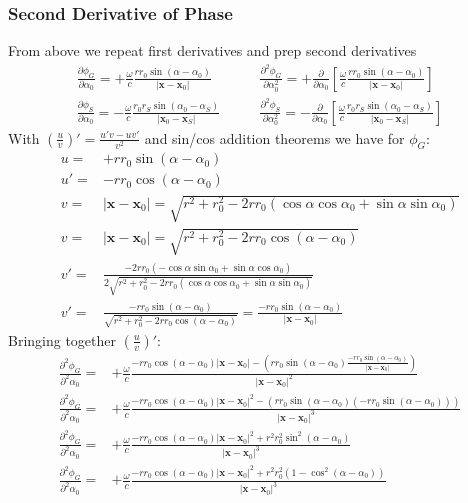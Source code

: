 \documentclass[a4paper,BCOR=15mm,10pt,twoside]{scrartcl}
\newcommand\wc{\frac{\omega}{c}}  %
\newcommand\azx{\alpha}  %
\renewcommand{\vec}[1]{\mathbf{#1}}  %
\begin{document}
\subsubsection{Second Derivative of Phase}
From above we repeat first derivatives and prep second derivatives
\begin{align}
\frac{\partial \phi_G}{\partial \azx_0} =+\wc \frac{r r_0 \sin(\azx-\azx_0)}{|\vec{x} -\vec{x}_0|}\qquad 
&\frac{\partial^2 \phi_G}{\partial \azx_0^2} =+\frac{\partial }{\partial \azx_0} [ \wc \frac{r r_0 \sin(\azx-\azx_0)}{|\vec{x} -\vec{x}_0|} ] \\
\frac{\partial \phi_S}{\partial \azx_0} =-\wc \frac{r_0 r_S \sin(\azx_0 - \azx_S)}{|\vec{x}_0 - \vec{x}_S|} \qquad
&\frac{\partial^2 \phi_S}{\partial \azx_0^2} =-\frac{\partial}{\partial \azx_0} [ \wc \frac{r_0 r_S \sin(\azx_0 - \azx_S)}{|\vec{x}_0 - \vec{x}_S|} ] 
\end{align}
With $(\frac{u}{v})' = \frac{u'v-uv'}{v^2}$ and sin/cos addition theorems we have for $\phi_G$:
\begin{align}
u =&  + r r_0 \sin(\azx-\azx_0)\\
u' =& - r r_0 \cos(\azx-\azx_0)\\
v =& |\vec{x} -\vec{x}_0| = \sqrt{r^2 + r_0^2 - 2 r r_0 (\cos\azx \cos\azx_0 + \sin\azx \sin\azx_0)}\\
v =& |\vec{x} -\vec{x}_0| = \sqrt{r^2 + r_0^2 - 2 r r_0 \cos(\azx - \azx_0)}\\
v' =& \frac{- 2 r r_0 (-\cos\azx \sin\azx_0 + \sin\azx \cos\azx_0)}{2\sqrt{r^2 + r_0^2 - 2 r r_0 (\cos\azx \cos\azx_0 + \sin\azx \sin\azx_0)}}\\
v' =& \frac{- r r_0 \sin(\azx-\azx_0)}{\sqrt{r^2 + r_0^2 - 2 r r_0 \cos(\azx-\azx_0)}} = \frac{- r r_0 \sin(\azx-\azx_0)}{|\vec{x} -\vec{x}_0|}
\end{align}
Bringing together $(\frac{u}{v})'$:
\begin{align}
\frac{\partial^2 \phi_G}{\partial^2 \azx_0} =&+\wc \frac{
-r r_0 \cos(\azx-\azx_0) |\vec{x} -\vec{x}_0| -
(r r_0 \sin(\azx-\azx_0) \frac{- r r_0 \sin(\azx-\azx_0)}{|\vec{x} -\vec{x}_0|})
}
{|\vec{x} -\vec{x}_0|^2} \\
\frac{\partial^2 \phi_G}{\partial^2 \azx_0} =&+\wc \frac{
- r r_0 \cos(\azx-\azx_0) |\vec{x} -\vec{x}_0|^2-
(r r_0 \sin(\azx-\azx_0) (- r r_0 \sin(\azx-\azx_0))
)}
{|\vec{x} -\vec{x}_0|^3}\\
\frac{\partial^2 \phi_G}{\partial^2 \azx_0} =&+\wc \frac{
- r r_0 \cos(\azx-\azx_0) |\vec{x} -\vec{x}_0|^2 + 
r^2 r_0^2 \sin^2(\azx-\azx_0)
}
{|\vec{x} -\vec{x}_0|^3}\\
\frac{\partial^2 \phi_G}{\partial^2 \azx_0} =&+\wc \frac{
- r r_0 \cos(\azx-\azx_0) |\vec{x} -\vec{x}_0|^2 + 
r^2 r_0^2 (1-\cos^2(\azx-\azx_0))
}
{|\vec{x} -\vec{x}_0|^3}
\end{align}
\end{document}
